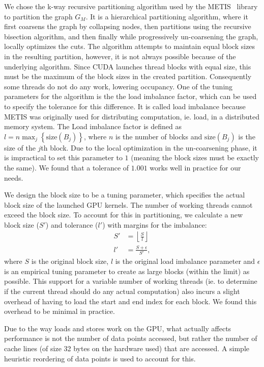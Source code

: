We chose the k-way recursive partitioning algorithm used by the 
METIS~\cite{metis} library to partition the graph $G_M$. It is a hierarchical
partitioning algorithm, where it first coarsens the graph by collapsing nodes, 
then partitions using the recursive bisection algorithm, and then finally while 
progressively un-coarsening the graph, locally optimizes the cuts. The algorithm 
attempts to maintain equal block sizes in the resulting partition, however, it 
is not always possible because of the underlying algorithm. Since CUDA launches 
thread blocks with equal size, this must be the maximum of the block sizes in 
the created partition. Consequently some threads do not do any work, 
lowering occupancy. One of the tuning parameters for the algorithm is the the 
load imbalance factor, which can be used to specify the tolerance for this 
difference. It is called load imbalance because METIS was originally used 
for distributing computation, ie. load, in a distributed memory system. The 
Load imbalance factor is defined as $l = n\max_j \left\{\mathrm{size}(B_j) 
\right\}$, where $n$ is the number of blocks and $\mathrm{size}(B_j)$ is the 
size of the $j$th block. Due to the local optimization in the un-coarsening 
phase, it is impractical to set this parameter to $1$ (meaning the block sizes 
must be exactly the same). We found that a tolerance of $1.001$ works well in 
practice for our needs.

We design the block size to be a tuning parameter, which specifies the actual
block size of the launched GPU kernels. The number of working threads
cannot exceed the block size. To account for this in partitioning, we calculate 
a new block size ($S'$) and tolerance ($l'$) with margins for the imbalance:
\begin{align}
  S' &= \left\lfloor \frac{S}{l} \right\rfloor \\
  l' &= \frac{S + \epsilon}{S'},
\end{align}
where $S$ is the original block size, $l$ is the original load imbalance
parameter and $\epsilon$ is an empirical tuning parameter to create as large
blocks (within the limit) as possible. This support for a variable number of 
working threads (ie. to determine if the current thread should do any actual 
computation) also incurs a slight overhead of having to load the start and end 
index for each block. We found this overhead to be minimal in practice.

Due to the way loads and stores work on the GPU, what actually affects
performance is not the number of data points accessed, but rather the number of
cache lines (of size 32 bytes on the hardware used) that are accessed. A simple 
heuristic reordering of data points is used to account for this. 

